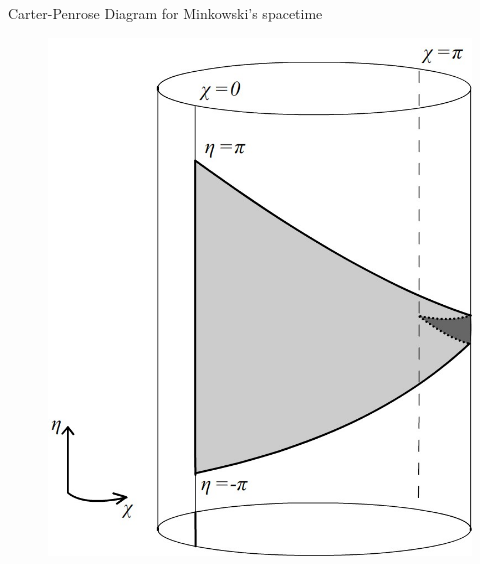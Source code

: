 \documentclass{beamer}
\begin{document}
        \begin{frame}{Carter-Penrose Diagram for Minkowski's spacetime}
        	\begin{center}
				\begin{figure}
				\includegraphics[scale=0.75] {fig13.jpg}
				\end{figure}
			\end{center}	
        \end{frame}
        
\end{document}
